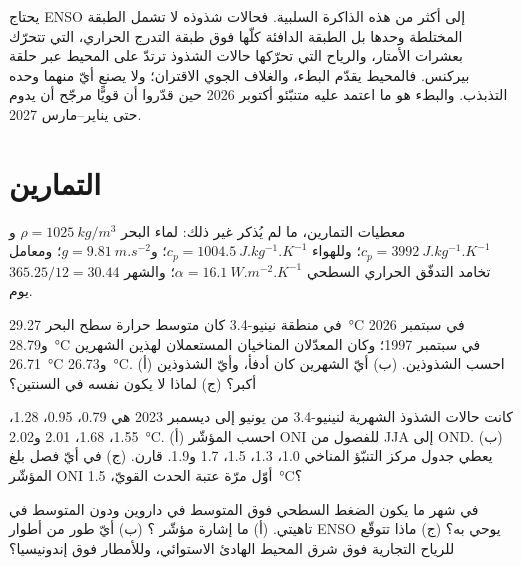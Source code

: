 يحتاج ENSO إلى أكثر من هذه الذاكرة السلبية. فحالات شذوذه لا تشمل الطبقة المختلطة وحدها بل
الطبقة الدافئة كلّها فوق طبقة التدرج الحراري، التي تتحرّك بعشرات الأمتار، والرياح التي
تحرّكها حالات الشذوذ ترتدّ على المحيط عبر حلقة بيركنس. فالمحيط يقدّم البطء،
والغلاف الجوي الاقتران؛ ولا يصنع أيّ منهما وحده التذبذب. والبطء هو ما اعتمد عليه
متنبّئو أكتوبر 2026 حين قدّروا أن  قويًّا مرجّح أن يدوم حتى
يناير--مارس 2027.

\section*{التمارين}\label{sec:b2:climate-variability:exercises}

معطيات التمارين، ما لم يُذكر غير ذلك: لماء البحر $\rho = \qty{1025}{kg/m^3}$ و$c_p =
\qty{3992}{J.kg^{-1}.K^{-1}}$؛ وللهواء $c_p = \qty{1004.5}{J.kg^{-1}.K^{-1}}$؛ و$g =
\qty{9.81}{m.s^{-2}}$؛ ومعامل تخامد التدفّق الحراري السطحي $\alpha =
\qty{16.1}{W.m^{-2}.K^{-1}}$؛ والشهر $365.25/12 = 30.44$ يوم.

\begin{exercise}[$\star$]\label{exo:b2:climate-variability:1}
في منطقة نينيو-3.4 كان متوسط حرارة سطح البحر \qty{29.27}{\celsius} في سبتمبر
2026 و\qty{28.79}{\celsius} في سبتمبر 1997؛ وكان المعدّلان المناخيان المستعملان لهذين الشهرين
\qty{26.71}{\celsius} و\qty{26.73}{\celsius}. (أ) احسب الشذوذين. (ب) أيّ
الشهرين كان أدفأ، وأيّ الشذوذين أكبر؟ (ج) لماذا لا يكون  نفسه في
السنتين؟
\end{exercise}

\begin{exercise}[$\star$]\label{exo:b2:climate-variability:2}
كانت حالات الشذوذ الشهرية لنينيو-3.4 من يونيو إلى ديسمبر 2023 هي 0.79، 0.95، 1.28، 1.55، 1.68، 2.01
و\qty{2.02}{\celsius}. (أ) احسب المؤشّر ONI للفصول من JJA إلى OND. (ب) يعطي جدول
مركز التنبّؤ المناخي 1.0، 1.3، 1.5، 1.7 و1.9. قارن. (ج) في أيّ فصل
بلغ المؤشّر ONI أوّل مرّة عتبة الحدث القويّ، \qty{1.5}{\celsius}؟
\end{exercise}

\begin{exercise}[$\star$]\label{exo:b2:climate-variability:3}
في شهر ما يكون الضغط السطحي فوق المتوسط في داروين ودون المتوسط في تاهيتي.
(أ) ما إشارة مؤشّر ؟ (ب) أيّ طور من أطوار ENSO يوحي به؟
(ج) ماذا تتوقّع للرياح التجارية فوق شرق المحيط الهادئ الاستوائي، وللأمطار
فوق إندونيسيا؟
\end{exercise}

